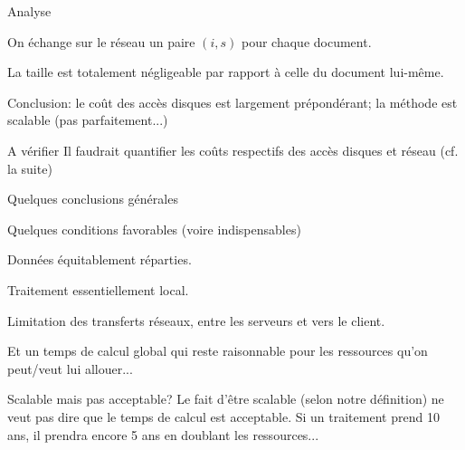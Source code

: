 \begin{frame}{Analyse}

On échange sur le réseau un paire $(i, s)$ pour chaque document.

\vfill

La taille est \alert{totalement négligeable} par rapport à celle du document lui-même.

\vfill

Conclusion: \alert{le coût des accès disques est largement prépondérant; la méthode est 
scalable (pas parfaitement...)}

\begin{remblock}{A vérifier}
Il faudrait \alert{quantifier} les coûts respectifs des accès disques et réseau (cf. la suite)
\end{remblock}

\end{frame}


\begin{frame}{Quelques conclusions générales}

Quelques conditions favorables (voire indispensables) 

\begin{redbullet}
  \item Données équitablement réparties.
  \item Traitement essentiellement \alert{local}.
  \item Limitation des transferts réseaux, entre les serveurs et vers le client.
  \item Et un temps de calcul global qui reste raisonnable pour les ressources qu'on peut/veut lui allouer...
\end{redbullet}

\begin{remblock}{Scalable mais pas acceptable?}
Le fait d'être scalable (selon notre définition) ne veut pas dire que le temps
de calcul est \alert{acceptable}. Si un traitement prend 10 ans, il prendra encore 5 ans en doublant les ressources...
\end{remblock}


\end{frame}




